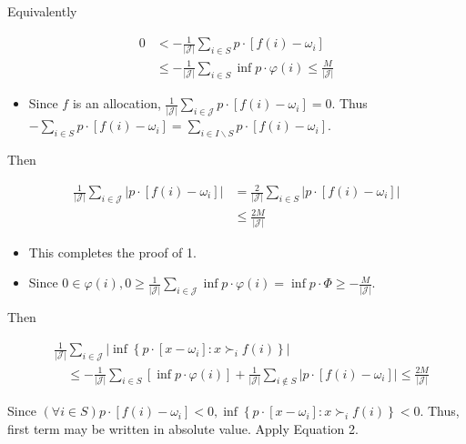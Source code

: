 \documentclass[10pt]{article}
\begin{document}
Equivalently


\begin{align*}
0 & <-\frac{1}{|\mathcal{J}|} \sum_{i \in S} p \cdot\left[f(i)-\omega_{i}\right] \\
& \leq-\frac{1}{|\mathcal{J}|} \sum_{i \in S} \inf p \cdot \varphi(i) \leq \frac{M}{|\mathcal{J}|} \tag{2}
\end{align*}


\begin{itemize}
  \item Since $f$ is an allocation, $\frac{1}{|\mathcal{J}|} \sum_{i \in \mathcal{J}} p \cdot\left[f(i)-\omega_{i}\right]=0$. Thus $-\sum_{i \in S} p \cdot\left[f(i)-\omega_{i}\right]=\sum_{i \in I \backslash S} p \cdot\left[f(i)-\omega_{i}\right]$.
\end{itemize}

Then

$$
\begin{aligned}
\frac{1}{|\mathcal{J}|} \sum_{i \in \mathcal{J}}\left|p \cdot\left[f(i)-\omega_{i}\right]\right| & =\frac{2}{|\mathcal{J}|} \sum_{i \in S}\left|p \cdot\left[f(i)-\omega_{i}\right]\right| \\
& \leq \frac{2 M}{|\mathcal{J}|}
\end{aligned}
$$

\begin{itemize}
  \item This completes the proof of 1.
  \item Since $0 \in \varphi(i), 0 \geq \frac{1}{|\mathcal{J}|} \sum_{i \in \mathcal{J}} \inf p \cdot \varphi(i)=\inf p \cdot \Phi \geq-\frac{M}{|\mathcal{J}|}$.
\end{itemize}

Then

$$
\begin{aligned}
& \frac{1}{|\mathcal{J}|} \sum_{i \in \mathcal{J}}\left|\inf \left\{p \cdot\left[x-\omega_{i}\right]: x \succ_{i} f(i)\right\}\right| \\
& \quad \leq-\frac{1}{|\mathcal{J}|} \sum_{i \in S}[\inf p \cdot \varphi(i)]+\frac{1}{|\mathcal{J}|} \sum_{i \notin S}\left|p \cdot\left[f(i)-\omega_{i}\right]\right| \leq \frac{2 M}{|\mathcal{J}|}
\end{aligned}
$$

Since $(\forall i \in S) p \cdot\left[f(i)-\omega_{i}\right]<0, \inf \left\{p \cdot\left[x-\omega_{i}\right]: x \succ_{i} f(i)\right\}<0$. Thus, first term may be written in absolute value. Apply Equation 2.
\end{document}
